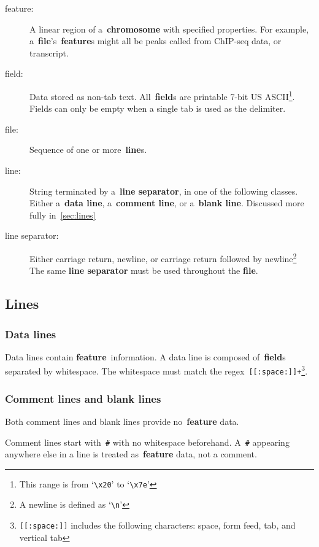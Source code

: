 \documentclass[11pt]{article}
\begin{document}
\begin{description}
\item[feature:]
  A linear region of a~\textbf{chromosome} with specified properties.
  For example, a~\textbf{file}'s~\textbf{feature}s might all be peaks called from ChIP-seq data, or transcript.

\item[field:]
  Data stored as non-tab text.
  All~\textbf{field}s are printable 7-bit US \ac{ASCII}\footnote{This range is from `\texttt{\textbackslash x20}' to `\texttt{\textbackslash x7e}'}.
  Fields can only be empty when a single tab is used as the delimiter.

\item[file:]
  Sequence of one or more~\textbf{line}s.

\item[line:]
  String terminated by a~\textbf{line separator}, in one of the following classes.
  Either a~\textbf{data line}, a~\textbf{comment line}, or a~\textbf{blank line}.
  Discussed more fully in~\autoref{sec:lines}

\item[line separator:]
  Either carriage return, newline, or carriage return followed by newline\footnote{A newline is defined as `\texttt{\textbackslash n}'}
  The same \textbf{line separator} must be used throughout the \textbf{file}.
\end{description}

\subsection{Lines}\label{sec:lines}

\subsubsection{Data lines}

Data lines contain \textbf{feature}~information.
A data line is composed of~\textbf{field}s separated by whitespace.
The whitespace must match the \ac{regex}~\texttt{[[:space:]]+}\footnote{\texttt{[[:space:]]} includes the following characters: space, form feed, tab, and vertical tab}.

\subsubsection{Comment lines and blank lines}

Both comment lines and blank lines provide no~\textbf{feature} data.

Comment lines start with~\texttt{\#} with no whitespace beforehand.
A~\texttt{\#} appearing anywhere else in a line is treated as~\textbf{feature} data, not a comment.
\end{document}
